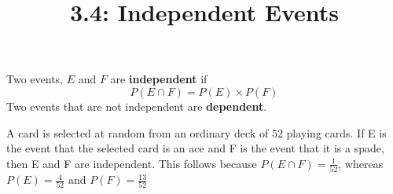 \documentclass{article}
\title{3.4: Independent Events}
\begin{document}
\maketitle
\begin{definition}
Two events, $E$ and $F$ are \textbf{independent} if $$P(E\cap F) = P(E)\times P(F)$$Two events that are not independent are \textbf{dependent}.  
\end{definition}

\begin{example}
    A card is selected at random from an ordinary deck of $52$ playing cards. If E is the event that the selected card is an ace and F is the event that it is a spade, then E and F are independent. This follows because $P(E\cap F) = \frac{1}{52}$, whereas $P(E) = \frac{4}{52}$ and $P(F) = \frac{13}{52}$
\end{example}
\end{document}
